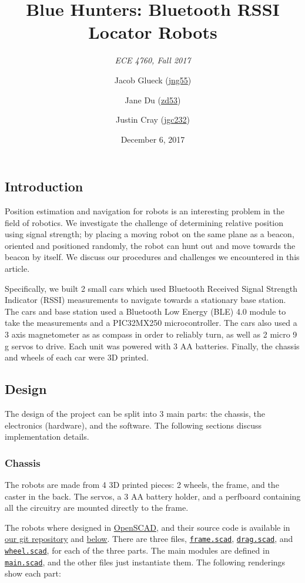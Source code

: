 \documentclass[]{article}
\title{Blue Hunters: Bluetooth RSSI Locator Robots}
\subtitle{\emph{ECE 4760, Fall 2017}}
\author{Jacob Glueck (\href{mailto:jng55@cornell.edu}{jng55}) \and Jane Du (\href{mailto:zd53@cornell.edu}{zd53}) \and Justin Cray (\href{mailto:jgc232@cornell.edu}{jgc232})}
\date{December 6, 2017}
\begin{document}
\maketitle

\hypertarget{introduction}{%
\subsection{Introduction}\label{introduction}}

Position estimation and navigation for robots is an interesting problem
in the field of robotics. We investigate the challenge of determining
relative position using signal strength; by placing a moving robot on
the same plane as a beacon, oriented and positioned randomly, the
robot can hunt out and move towards the beacon by itself. We discuss 
our procedures and challenges we encountered in this article.

Specifically, we built 2 small cars which used Bluetooth Received Signal Strength
Indicator (RSSI) measurements to navigate towards a stationary base
station. The cars and base station used a Bluetooth Low Energy (BLE) 4.0
module to take the measurements and a PIC32MX250 microcontroller. The
cars also used a 3 axis magnetometer as as compass in order to reliably
turn, as well as 2 micro 9 g servos to drive. Each unit was powered with
3 AA batteries. Finally, the chassis and wheels of each car were 3D
printed.

\hypertarget{design}{%
\subsection{Design}\label{design}}

The design of the project can be split into 3 main parts: the chassis, the electronics (hardware), and the software. The following sections discuss implementation details.

\hypertarget{chassis}{%
\subsubsection{Chassis}\label{chassis}}

The robots are made from 4 3D printed pieces: 2 wheels, the frame, and
the caster in the back. The servos, a 3 AA battery holder, and a
perfboard containing all the circuitry are mounted directly to the
frame.

The robots where designed in \href{http://www.openscad.org/}{OpenSCAD},
and their source code is available in
\href{https://github.com/orangeturtle739/bluehunters/tree/master/cad}{our
git repository} and
\protect\hyperlink{appendix-b-source-listing}{below}. There are three
files, \href{generated/frame.scad.html}{\texttt{frame.scad}},
\href{generated/drag.scad.html}{\texttt{drag.scad}}, and
\href{generated/wheel.scad.html}{\texttt{wheel.scad}}, for each of the
three parts. The main modules are defined in
\href{generated/main.scad.html}{\texttt{main.scad}}, and the other files
just instantiate them. The following renderings show each part:
\end{document}
